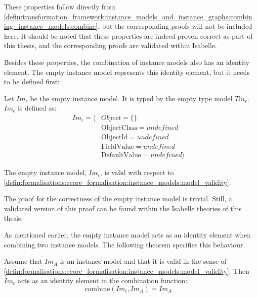 These properties follow directly from \cref{defin:transformation_framework:instance_models_and_instance_graphs:combining_instance_models:combine}, but the corresponding proofs will not be included here. It should be noted that these properties are indeed proven correct as part of this thesis, and the corresponding proofs are validated within Isabelle.

Besides these properties, the combination of instance models also has an identity element. The empty instance model represents this identity element, but it needs to be defined first:

\begin{defin}
\label{defin:transformation_framework:instance_models_and_instance_graphs:combining_instance_models:empty_instance_model}
Let $Im_{\epsilon}$ be the empty instance model. It is typed by the empty type model $Tm_{\epsilon}$. $Im_{\epsilon}$ is defined as:
\begin{align*}
Im_{\epsilon} = \langle&
Object = \{\} \\&
\mathrm{ObjectClass} = undefined \\&
\mathrm{ObjectId} = undefined \\&
\mathrm{FieldValue} = undefined \\&
\mathrm{DefaultValue} = undefined\rangle
\end{align*}
\end{defin}

\begin{thm}
\label{defin:transformation_framework:instance_models_and_instance_graphs:combining_instance_models:imod_empty_correct}
The empty instance model, $Im_{\epsilon}$, is valid with respect to
\cref{defin:formalisations:ecore_formalisation:instance_models:model_validity}.
\end{thm}

The proof for the correctness of the empty instance model is trivial. Still, a validated version of this proof can be found within the Isabelle theories of this thesis.

As mentioned earlier, the empty instance model acts as an identity element when combining two instance models. The following theorem specifies this behaviour.

\begin{thm}
\label{defin:transformation_framework:instance_models_and_instance_graphs:combining_instance_models:imod_combine_identity}
Assume that $Im_A$ is an instance model and that it is valid in the sense of \cref{defin:formalisations:ecore_formalisation:instance_models:model_validity}. Then $Im_{\epsilon}$ acts as an identity element in the combination function:
\begin{equation*}
    \mathrm{combine}(Im_{\epsilon}, Im_A) = Im_A
\end{equation*}
\end{thm}

